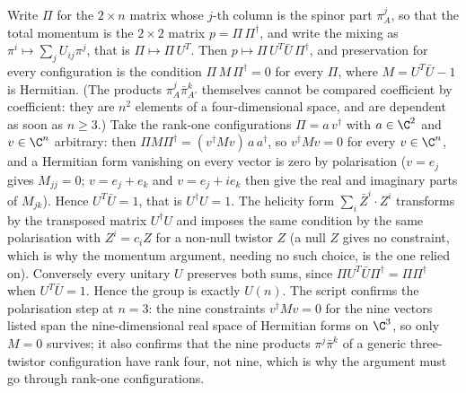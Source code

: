 Write $\Pi$ for the $2 \times n$ matrix whose $j$-th column is the spinor part $\pi^{j}_{A}$, so that the total momentum is the $2 \times 2$ matrix $p = \Pi\,\Pi^{\dagger}$, and write the mixing as $\pi^{i} \mapsto \sum_{j} U_{ij}\pi^{j}$, that is $\Pi \mapsto \Pi\,U^{T}$. Then $p \mapsto \Pi\,U^{T}\bar{U}\,\Pi^{\dagger}$, and preservation for every configuration is the condition $\Pi\,M\,\Pi^{\dagger} = 0$ for every $\Pi$, where $M = U^{T}\bar{U} - 1$ is Hermitian. (The products $\pi^{j}_{A}\bar\pi^{k}_{A'}$ themselves cannot be compared coefficient by coefficient: they are $n^{2}$ elements of a four-dimensional space, and are dependent as soon as $n \ge 3$.) Take the rank-one configurations $\Pi = a\,v^{\dagger}$ with $a \in \C^{2}$ and $v \in \C^{n}$ arbitrary: then $\Pi M \Pi^{\dagger} = (v^{\dagger}Mv)\,a\,a^{\dagger}$, so $v^{\dagger}Mv = 0$ for every $v \in \C^{n}$, and a Hermitian form vanishing on every vector is zero by polarisation ($v = e_{j}$ gives $M_{jj} = 0$; $v = e_{j} + e_{k}$ and $v = e_{j} + ie_{k}$ then give the real and imaginary parts of $M_{jk}$). Hence $U^{T}\bar{U} = 1$, that is $U^{\dagger}U = 1$. The helicity form $\sum_{i}\bar{Z}^{i}\cdot Z^{i}$ transforms by the transposed matrix $U^{\dagger}U$ and imposes the same condition by the same polarisation with $Z^{i} = c_{i}Z$ for a non-null twistor $Z$ (a null $Z$ gives no constraint, which is why the momentum argument, needing no such choice, is the one relied on). Conversely every unitary $U$ preserves both sums, since $\Pi U^{T}\bar{U}\Pi^{\dagger} = \Pi\Pi^{\dagger}$ when $U^{T}\bar{U} = 1$. Hence the group is exactly $U(n)$. The script confirms the polarisation step at $n = 3$: the nine constraints $v^{\dagger}Mv = 0$ for the nine vectors listed span the nine-dimensional real space of Hermitian forms on $\C^{3}$, so only $M = 0$ survives; it also confirms that the nine products $\pi^{j}\bar\pi^{k}$ of a generic three-twistor configuration have rank four, not nine, which is why the argument must go through rank-one configurations.
